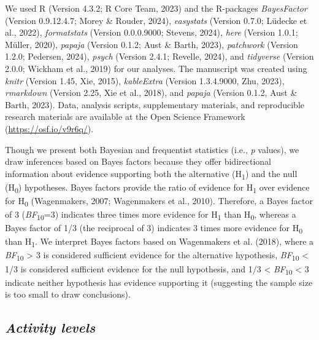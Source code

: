 \documentclass[
  pub]{apa6}
\begin{document}
We used R (Version 4.3.2; R Core Team, 2023) and the R-packages \emph{BayesFactor} (Version 0.9.12.4.7; Morey \& Rouder, 2024), \emph{easystats} (Version 0.7.0; Lüdecke et al., 2022), \emph{formatstats} (Version 0.0.0.9000; Stevens, 2024), \emph{here} (Version 1.0.1; Müller, 2020), \emph{papaja} (Version 0.1.2; Aust \& Barth, 2023), \emph{patchwork} (Version 1.2.0; Pedersen, 2024), \emph{psych} (Version 2.4.1; Revelle, 2024), and \emph{tidyverse} (Version 2.0.0; Wickham et al., 2019) for our analyses. The manuscript was created using \emph{knitr} (Version 1.45, Xie, 2015), \emph{kableExtra} (Version 1.3.4.9000, Zhu, 2023), \emph{rmarkdown} (Version 2.25, Xie et al., 2018), and \emph{papaja} (Version 0.1.2, Aust \& Barth, 2023). Data, analysis scripts, supplementary materials, and reproducible research materials are available at the Open Science Framework (\url{https://osf.io/v9r6q/}).

Though we present both Bayesian and frequentist statistics (i.e., \emph{p} values), we draw inferences based on Bayes factors because they offer bidirectional information about evidence supporting both the alternative (H\textsubscript{1}) and the null (H\textsubscript{0}) hypotheses. Bayes factors provide the ratio of evidence for H\textsubscript{1} over evidence for H\textsubscript{0} (Wagenmakers, 2007; Wagenmakers et al., 2010). Therefore, a Bayes factor of 3 (\emph{BF}\textsubscript{10}=3) indicates three times more evidence for H\textsubscript{1} than H\textsubscript{0}, whereas a Bayes factor of 1/3 (the reciprocal of 3) indicates 3 times more evidence for H\textsubscript{0} than H\textsubscript{1}. We interpret Bayes factors based on Wagenmakers et al. (2018), where a \emph{BF}\textsubscript{10} \textgreater{} 3 is considered sufficient evidence for the alternative hypothesis, \emph{BF}\textsubscript{10} \textless{} 1/3 is considered sufficient evidence for the null hypothesis, and 1/3 \textless{} \emph{BF}\textsubscript{10} \textless{} 3 indicate neither hypothesis has evidence supporting it (suggesting the sample size is too small to draw conclusions).

\hypertarget{activity-levels-1}{%
\subsection{\texorpdfstring{\emph{Activity levels}}{Activity levels}}\label{activity-levels-1}}
\end{document}
